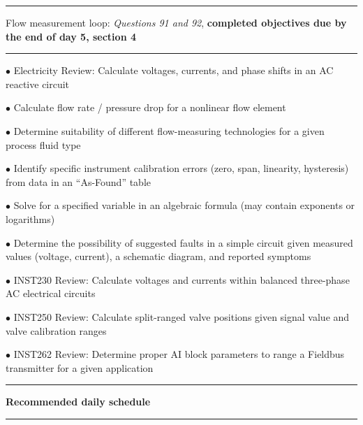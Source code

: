  
\vskip 10pt

\hrule \vskip 5pt
\noindent
{}

\vskip 5pt

\noindent Flow measurement loop: {\it Questions 91 and 92}, {\bf completed objectives due by the end of day 5, section 4}

\vskip 10pt

\hrule \vskip 5pt
\noindent
{}

\vskip 5pt


\vskip 2pt 

\item{$\bullet$} Electricity Review: Calculate voltages, currents, and phase shifts in an AC reactive circuit
\item{$\bullet$} Calculate flow rate / pressure drop for a nonlinear flow element
\item{$\bullet$} Determine suitability of different flow-measuring technologies for a given process fluid type
\item{$\bullet$} Identify specific instrument calibration errors (zero, span, linearity, hysteresis) from data in an ``As-Found'' table
\item{$\bullet$} Solve for a specified variable in an algebraic formula (may contain exponents or logarithms)
\item{$\bullet$} Determine the possibility of suggested faults in a simple circuit given measured values (voltage, current), a schematic diagram, and reported symptoms
\item{$\bullet$} INST230 Review: Calculate voltages and currents within balanced three-phase AC electrical circuits
\item{$\bullet$} INST250 Review: Calculate split-ranged valve positions given signal value and valve calibration ranges
\item{$\bullet$} INST262 Review: Determine proper AI block parameters to range a Fieldbus transmitter for a given application

\vskip 10pt



\hrule \vskip 5pt

\centerline{\bf Recommended daily schedule} 

\vskip 5pt

\filbreak
\hrule \vskip 5pt
\noindent {}

